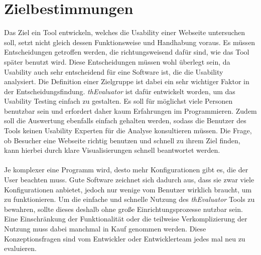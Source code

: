 %
%
%
%


\section{Zielbestimmungen}

Das Ziel ein Tool entwickeln, welches die Usability einer Webseite untersuchen soll, setzt nicht gleich dessen Funktionsweise und Handhabung voraus. Es müssen Entscheidungen getroffen werden, die richtungsweisend dafür sind, wie das Tool später benutzt wird. Diese Entscheidungen müssen wohl überlegt sein, da Usability auch sehr entscheidend für eine Software ist, die die Usability analysiert. Die Definition einer Zielgruppe ist dabei ein sehr wichtiger Faktor in der Entscheidungsfindung. \textit{thEvaluator} ist dafür entwickelt worden, um das Usability Testing einfach zu gestalten. Es soll für möglichst viele Personen benutzbar sein und erfordert daher kaum Erfahrungen im Programmieren. Zudem soll die Auswertung ebenfalls einfach gehalten werden, sodass die Benutzer des Tools keinen Usability Experten für die Analyse konsultieren müssen. Die Frage, ob Besucher eine Webseite richtig benutzen und schnell zu ihrem Ziel finden, kann hierbei durch klare Visualisierungen schnell beantwortet werden.\\
\\
Je komplexer eine Programm wird, desto mehr Konfigurationen gibt es, die der User beachten muss. Gute Software zeichnet sich dadurch aus, dass sie zwar viele Konfigurationen anbietet, jedoch nur wenige vom Benutzer wirklich braucht, um zu funktionieren. Um die einfache und schnelle Nutzung des \textit{thEvaluator} Tools zu bewahren, sollte dieses deshalb ohne große Einrichtungsprozesse nutzbar sein. Eine Einschränkung der Funktionalität oder die teilweise Verkomplizierung der Nutzung muss dabei manchmal in Kauf genommen werden. Diese Konzeptionsfragen sind vom Entwickler oder Entwicklerteam jedes mal neu zu evaluieren.\\
\\
